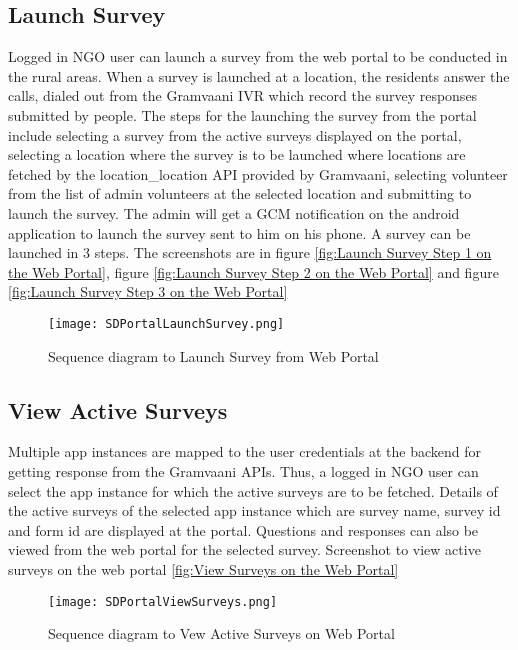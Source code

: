 \subsection{Launch Survey}
Logged in NGO user can launch a survey from the web portal to be conducted in the rural areas. When a survey is launched at a location, the residents answer the calls, dialed out from the Gramvaani IVR which record the survey responses submitted by people. The steps for the launching the survey from the portal include selecting a survey from the active surveys displayed on the portal, selecting a location where the survey is to be launched where locations are fetched by the location\_location API provided by Gramvaani, selecting volunteer from the list of admin volunteers at the selected location and submitting to launch the survey. The admin will get a GCM notification on the android application to launch the survey sent to him on his phone. A survey can be launched in 3 steps. The screenshots are in figure \ref{fig:Launch Survey Step 1 on the Web Portal}, figure \ref{fig:Launch Survey Step 2 on the Web Portal} and figure \ref{fig:Launch Survey Step 3 on the Web Portal}\\
\begin{figure}[H]
    \centering
	\texttt{[image: SDPortalLaunchSurvey.png]}
    \caption{Sequence diagram to Launch Survey from Web Portal}
    \label{fig:Sequence diagram to Launch Survey from Web Portal}
\end{figure}

\subsection{View Active Surveys}
Multiple app instances are mapped to the user credentials at the backend for getting response from the Gramvaani APIs. Thus, a logged in NGO user can select the app instance for which the active surveys are to be fetched. Details of the active surveys of the selected app instance which are survey name, survey id and form id are displayed at the portal. Questions and responses can also be viewed from the web portal for the selected survey. Screenshot to view active surveys on the web portal \ref{fig:View Surveys on the Web Portal}\\
\begin{figure}[H]
    \centering
	\texttt{[image: SDPortalViewSurveys.png]}
    \caption{Sequence diagram to Vew Active Surveys on Web Portal}
    \label{fig:Sequence diagram to Vew Active Surveys on Web Portal}
\end{figure}
\

